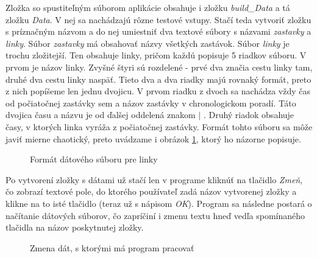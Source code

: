 Zložka so spustiteľným súborom aplikácie obsahuje i zložku \textit{build\_Data} a tá zložku \textit{Data}. V nej sa nachádzajú rôzne testové vstupy. Stačí teda vytvoriť zložku s príznačným názvom a do nej umiestniť dva textové súbory s názvami \textit{zastavky} a \textit{linky}. Súbor \textit{zastavky} má obsahovať názvy všetkých zastávok. Súbor \textit{linky} je trochu zložitejší. Ten obsahuje linky, pričom každú popisuje 5 riadkov súboru. V prvom je názov linky. Zvyšné štyri sú rozdelené - prvé dva značia cestu linky tam, druhé dva cestu linky naspäť. Tieto dva a dva riadky majú rovnaký formát, preto z nich popíšeme len jednu dvojicu. V prvom riadku z dvoch sa nachádza vždy čas od počiatočnej zastávky sem a názov zastávky v chronologickom poradí. Táto dvojica času a názvu je od ďalšej oddelená znakom $|$ . Druhý riadok obsahuje časy, v ktorých linka vyráža z počiatočnej zastávky. Formát tohto súboru sa môže javiť mierne chaotický, preto uvádzame i obrázok \ref{Format_datoveho_suboru1}, ktorý ho názorne popisuje.\newline

\begin{figure}[H]
  \caption{Formát dátového súboru pre linky}
  \label{Format_datoveho_suboru1}
\end{figure}

Po vytvorení zložky s dátami už stačí len v programe kliknúť na tlačidlo \textit{Zmeň}, čo zobrazí textové pole, do ktorého používateľ zadá názov vytvorenej zložky a klikne na to isté tlačidlo (teraz už s nápisom \textit{OK}). Program sa následne postará o načítanie dátových súborov, čo zapríčiní i zmenu textu hneď vedľa spomínaného tlačidla na názov poskytnutej zložky.\newline

\begin{figure}[H]
  \caption{Zmena dát, s ktorými má program pracovať}
  \label{ukazka_programu3}
\end{figure}
